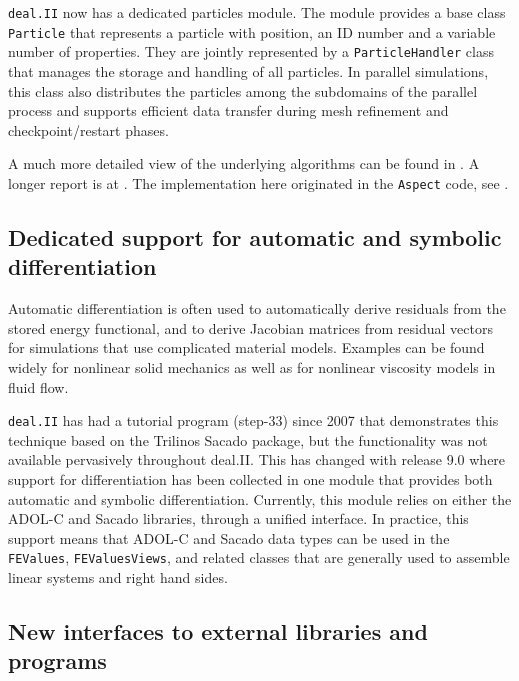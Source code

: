 \documentclass{ansarticle-preprint}
\newcommand{\specialword}[1]{\texttt{#1}}
\newcommand{\dealii}{{\specialword{deal.II}}\xspace}
\newcommand{\aspect}{\specialword{Aspect}\xspace}
\begin{document}
\dealii now has a dedicated particles module. The module provides a base class
\texttt{Particle} that represents a particle with position, an ID number and
a variable number of properties. They are jointly represented by a \texttt{ParticleHandler}
class that manages the storage and handling of all particles. In
parallel simulations, this class also
distributes the particles among the subdomains of the parallel process
and supports efficient data transfer during mesh refinement and
checkpoint/restart phases.

A much more detailed view of the underlying algorithms can be found in
\cite{GLHPB18}. A longer report is at \cite{GHPB16}. The
implementation here originated in the \aspect code, see \cite{KHB12,HDGB17}.


\subsection{Dedicated support for automatic and symbolic differentiation}

Automatic differentiation is often used to automatically derive
residuals from the stored energy functional, and to derive Jacobian
matrices from residual vectors for simulations that use complicated
material models. Examples can be found widely for nonlinear solid
mechanics as well as for nonlinear viscosity models in fluid flow.

\dealii has had a tutorial program (step-33) since 2007 that
demonstrates this technique based on the Trilinos Sacado package, but
the functionality was not available pervasively throughout
deal.II. This has changed with release 9.0 where support for
differentiation has been collected in one module that provides both
automatic and symbolic differentiation. Currently, this module relies
on either the ADOL-C and Sacado libraries, through a unified
interface. In practice, this support means that ADOL-C and Sacado data
types can be used in the \texttt{FEValues}, \texttt{FEValuesViews},
and related classes that are generally used to assemble linear systems
and right hand sides.


\subsection{New interfaces to external libraries and programs}
\end{document}

